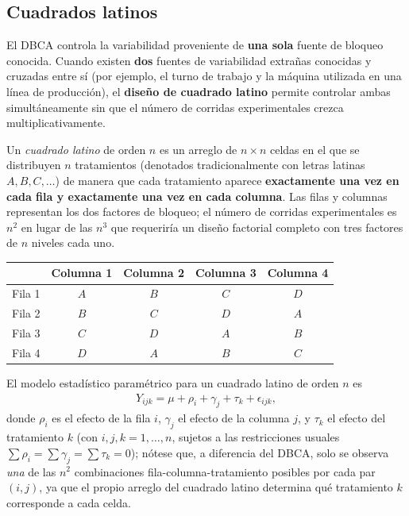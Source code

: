 \subsection{Cuadrados latinos}

El DBCA controla la variabilidad proveniente de \textbf{una sola} fuente de bloqueo conocida. Cuando existen \textbf{dos} fuentes de variabilidad extrañas conocidas y cruzadas entre sí (por ejemplo, el turno de trabajo y la máquina utilizada en una línea de producción), el \textbf{diseño de cuadrado latino} permite controlar ambas simultáneamente sin que el número de corridas experimentales crezca multiplicativamente.

\begin{definicion}
	Un \emph{cuadrado latino} de orden $n$ es un arreglo de $n \times n$ celdas en el que se distribuyen $n$ tratamientos (denotados tradicionalmente con letras latinas $A, B, C, \ldots$) de manera que cada tratamiento aparece \textbf{exactamente una vez en cada fila y exactamente una vez en cada columna}. Las filas y columnas representan los dos factores de bloqueo; el número de corridas experimentales es $n^2$ en lugar de las $n^3$ que requeriría un diseño factorial completo con tres factores de $n$ niveles cada uno.
\end{definicion}

\begin{center}
	\begin{tabular}{c|cccc}
		 & Columna 1 & Columna 2 & Columna 3 & Columna 4 \\ \hline
		Fila 1 & $A$ & $B$ & $C$ & $D$ \\
		Fila 2 & $B$ & $C$ & $D$ & $A$ \\
		Fila 3 & $C$ & $D$ & $A$ & $B$ \\
		Fila 4 & $D$ & $A$ & $B$ & $C$ \\
	\end{tabular}
\end{center}

El modelo estadístico paramétrico para un cuadrado latino de orden $n$ es
\begin{align}
	Y_{ijk} = \mu + \rho_i + \gamma_j + \tau_k + \epsilon_{ijk},
	\label{eq:modelo_cuadrado_latino}
\end{align}
donde $\rho_i$ es el efecto de la fila $i$, $\gamma_j$ el efecto de la columna $j$, y $\tau_k$ el efecto del tratamiento $k$ (con $i,j,k = 1,\ldots,n$, sujetos a las restricciones usuales $\sum \rho_i = \sum \gamma_j = \sum \tau_k = 0$); nótese que, a diferencia del DBCA, solo se observa \emph{una} de las $n^2$ combinaciones fila-columna-tratamiento posibles por cada par $(i,j)$, ya que el propio arreglo del cuadrado latino determina qué tratamiento $k$ corresponde a cada celda.

